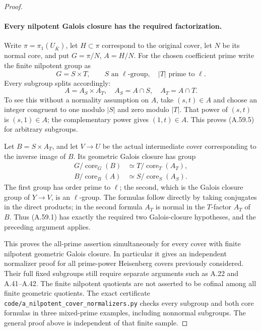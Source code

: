 \begin{proof}
\paragraph{Every nilpotent Galois closure has the required factorization.}
Write \(\pi=\pi_1(U_{\overline K})\), let \(H\subset\pi\)
correspond to the original cover, let \(N\) be its normal
core, and put \(G=\pi/N\), \(A=H/N\). For the chosen
coefficient prime write the finite nilpotent group as
\[
                   G=S\times T,
 \qquad S\text{ an }\ell\text{-group},\quad
              |T|\text{ prime to }\ell.               \tag{A.59.4}
\]
Every subgroup splits accordingly:
\[
             A=A_S\times A_T,
             \quad A_S=A\cap S,\quad A_T=A\cap T.
                                                        \tag{A.59.5}
\]
To see this without a normality assumption on \(A\),
take \((s,t)\in A\) and choose an integer congruent
to one modulo \(|S|\) and zero modulo \(|T|\).
That power of \((s,t)\) is \((s,1)\in A\); the
complementary power gives \((1,t)\in A\). This
proves (A.59.5) for arbitrary subgroups.

Let \(B=S\times A_T\), and let \(V\to U\) be
the actual intermediate cover corresponding to the
inverse image of \(B\). Its geometric Galois closure
has group
\[
 \begin{aligned}
 G/\operatorname{core}_G(B)
    &\simeq T/\operatorname{core}_T(A_T),\\
 B/\operatorname{core}_B(A)
    &\simeq S/\operatorname{core}_S(A_S).
 \end{aligned}                                          \tag{A.59.6}
\]
The first group has order prime to \(\ell\); the
second, which is the Galois closure group of
\(Y\to V\), is an \(\ell\)-group.
The formulas follow directly by taking conjugates
in the direct products; in the second formula
\(A_T\) is normal in the \(T\)-factor \(A_T\)
of \(B\). Thus (A.59.1) has exactly the required
two Galois-closure hypotheses, and the preceding
argument applies.

This proves the all-prime assertion simultaneously
for every cover with finite nilpotent geometric
Galois closure. In particular it gives an independent
normalizer proof for all prime-power Heisenberg
covers previously considered. Their full fixed
subgroups still require separate arguments such
as A.22 and A.41--A.42. The finite nilpotent
quotients are not asserted to be cofinal among
all finite geometric quotients.
The exact certificate \texttt{code/a\_nilpotent\_cover\_normalizers.py}
checks every subgroup and both core formulas in three mixed-prime
examples, including nonnormal subgroups. The general proof above
is independent of that finite sample.
\end{proof}
